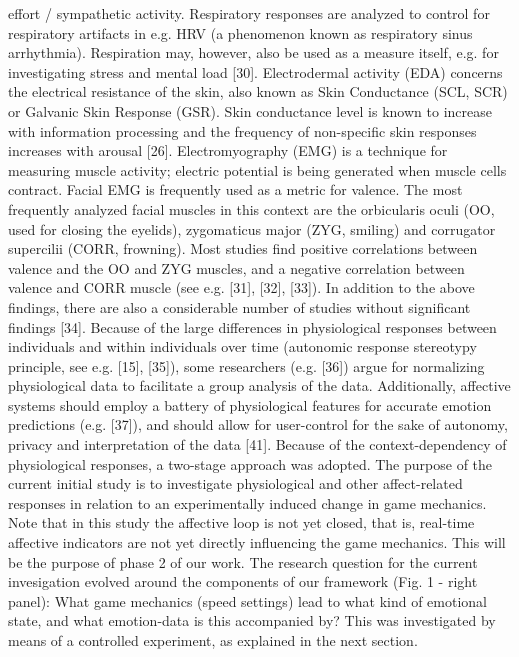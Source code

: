 effort / sympathetic activity. Respiratory responses are analyzed to control for respiratory artifacts in e.g. HRV (a phenomenon known as respiratory sinus arrhythmia). Respiration may, however, also be used as a measure itself, e.g. for investigating stress and mental load [30]. Electrodermal activity (EDA) concerns the electrical resistance of the skin, also known as Skin Conductance (SCL, SCR) or Galvanic Skin Response (GSR). Skin conductance level is known to increase with information processing and the frequency of non-specific skin responses increases with arousal [26]. Electromyography (EMG) is a technique for measuring muscle activity; electric potential is being generated when muscle cells contract. Facial EMG is frequently used as a metric for valence. The most frequently analyzed facial muscles in this context are the orbicularis oculi (OO, used for closing the eyelids), zygomaticus major (ZYG, smiling) and corrugator supercilii (CORR, frowning). Most studies find positive correlations between valence and the OO and ZYG muscles, and a negative correlation between valence and CORR muscle (see e.g. [31], [32], [33]). In addition to the above findings, there are also a considerable number of studies without significant findings [34]. Because of the large differences in physiological responses between individuals and within individuals over time (autonomic response stereotypy principle, see e.g. [15], [35]), some researchers (e.g. [36]) argue for normalizing physiological data to facilitate a group analysis of the data. Additionally, affective systems should employ a battery of physiological features for accurate emotion predictions (e.g. [37]), and should allow for user-control for the sake of autonomy, privacy and interpretation of the data [41]. Because of the context-dependency of physiological responses, a two-stage approach was adopted. The purpose of the current initial study is to investigate physiological and other affect-related responses in relation to an experimentally induced change in game mechanics. Note that in this study the affective loop is not yet closed, that is, real-time affective indicators are not yet directly influencing the game mechanics. This will be the purpose of phase 2 of our work. The research question for the current invesigation evolved around the components of our framework (Fig. 1 - right panel): What game mechanics (speed settings) lead to what kind of emotional state, and what emotion-data is this accompanied by? This was investigated by means of a controlled experiment, as explained in the next section.

